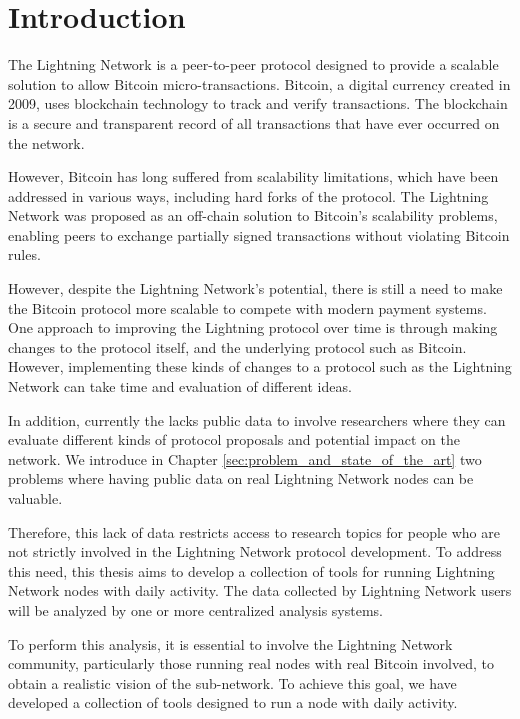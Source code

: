 \setcounter{page}{1}
\chapter{Introduction}\label{sec:introduction}

The Lightning Network is a peer-to-peer protocol designed to
provide a scalable solution to allow Bitcoin micro-transactions.
Bitcoin, a digital currency created in 2009, uses blockchain technology
to track and verify transactions. The blockchain is a secure and transparent
record of all transactions that have ever occurred on the network.

However, Bitcoin has long suffered from scalability limitations, which have been
addressed in various ways, including hard forks of the protocol.
The Lightning Network was proposed as an off-chain solution to Bitcoin's
scalability problems, enabling peers to exchange partially signed transactions
without violating Bitcoin rules.

However, despite the Lightning Network's potential, there is still a need
to make the Bitcoin protocol more scalable to compete with modern payment systems.
One approach to improving the Lightning protocol over time is through making changes
to the protocol itself, and the underlying protocol such as Bitcoin. However,
implementing these kinds of changes to a protocol such as the Lightning Network
can take time and evaluation of different ideas.

In addition, currently the {\LN} lacks public data to involve researchers
where they can evaluate different kinds of protocol proposals and
potential impact on the network. We introduce in Chapter \ref{sec:problem_and_state_of_the_art}
two problems where having public data on real Lightning Network nodes can be valuable.

Therefore, this lack of data restricts access to research topics for
people who are not strictly involved in the Lightning Network protocol development.
To address this need, this thesis aims to develop a collection of tools for
running Lightning Network nodes with daily activity. The data collected by
Lightning Network users will be analyzed by one or more centralized
analysis systems.

To perform this analysis, it is essential to involve the Lightning Network
community, particularly those running real nodes with real Bitcoin involved,
to obtain a realistic vision of the sub-network. To achieve this goal, we have
developed a collection of tools designed to run a node with daily activity.

